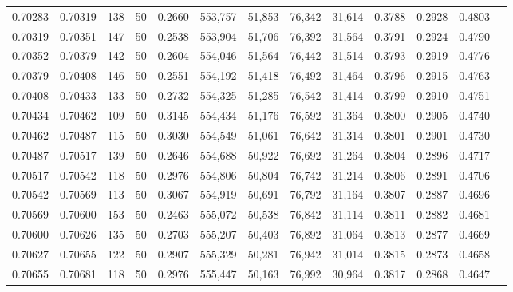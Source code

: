 \begin{tabular}{rrrrrrrrrrrrr}
0.70283 & 0.70319 &   138 &  50 &                                     0.2660 & 553,757 &  51,853 &  76,342 &  31,614 & 0.3788 & 0.2928 & 0.4803 \\
0.70319 & 0.70351 &   147 &  50 &                                     0.2538 & 553,904 &  51,706 &  76,392 &  31,564 & 0.3791 & 0.2924 & 0.4790 \\
0.70352 & 0.70379 &   142 &  50 &                                     0.2604 & 554,046 &  51,564 &  76,442 &  31,514 & 0.3793 & 0.2919 & 0.4776 \\
0.70379 & 0.70408 &   146 &  50 &                                     0.2551 & 554,192 &  51,418 &  76,492 &  31,464 & 0.3796 & 0.2915 & 0.4763 \\
0.70408 & 0.70433 &   133 &  50 &                                     0.2732 & 554,325 &  51,285 &  76,542 &  31,414 & 0.3799 & 0.2910 & 0.4751 \\
0.70434 & 0.70462 &   109 &  50 &                                     0.3145 & 554,434 &  51,176 &  76,592 &  31,364 & 0.3800 & 0.2905 & 0.4740 \\
0.70462 & 0.70487 &   115 &  50 &                                     0.3030 & 554,549 &  51,061 &  76,642 &  31,314 & 0.3801 & 0.2901 & 0.4730 \\
0.70487 & 0.70517 &   139 &  50 &                                     0.2646 & 554,688 &  50,922 &  76,692 &  31,264 & 0.3804 & 0.2896 & 0.4717 \\
0.70517 & 0.70542 &   118 &  50 &                                     0.2976 & 554,806 &  50,804 &  76,742 &  31,214 & 0.3806 & 0.2891 & 0.4706 \\
0.70542 & 0.70569 &   113 &  50 &                                     0.3067 & 554,919 &  50,691 &  76,792 &  31,164 & 0.3807 & 0.2887 & 0.4696 \\
0.70569 & 0.70600 &   153 &  50 &                                     0.2463 & 555,072 &  50,538 &  76,842 &  31,114 & 0.3811 & 0.2882 & 0.4681 \\
0.70600 & 0.70626 &   135 &  50 &                                     0.2703 & 555,207 &  50,403 &  76,892 &  31,064 & 0.3813 & 0.2877 & 0.4669 \\
0.70627 & 0.70655 &   122 &  50 &                                     0.2907 & 555,329 &  50,281 &  76,942 &  31,014 & 0.3815 & 0.2873 & 0.4658 \\
0.70655 & 0.70681 &   118 &  50 &                                     0.2976 & 555,447 &  50,163 &  76,992 &  30,964 & 0.3817 & 0.2868 & 0.4647 \\

\end{tabular}
